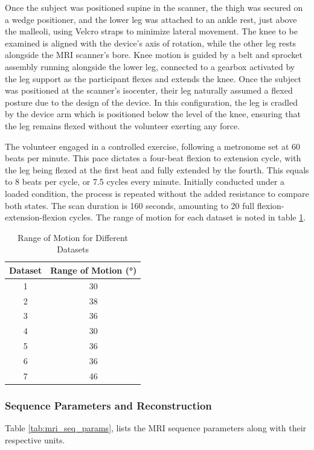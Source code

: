 \documentclass{micro-econ-thesis}
\begin{document}
Once the subject was positioned supine in the scanner, the thigh was secured on a wedge positioner, and the lower leg was attached to an ankle rest, just above the malleoli, using Velcro straps to minimize lateral movement. The knee to be examined is aligned with the device’s axis of rotation, while the other leg rests alongside the MRI scanner's bore.  Knee motion is guided by a belt and sprocket assembly running alongside the lower leg, connected to a gearbox activated by the leg support as the participant flexes and extends the knee. Once the subject was positioned at the scanner's isocenter, their leg naturally assumed a flexed posture due to the design of the device. In this configuration, the leg is cradled by the device arm which is positioned below the level of the knee, ensuring that the leg remains flexed without the volunteer exerting any force.


The volunteer engaged in a controlled exercise, following a metronome set at 60 beats per minute. This pace dictates a four-beat flexion to extension cycle, with the leg being flexed at the first beat and fully extended by the fourth. This equals to 8 beats per cycle, or 7.5 cycles every minute. Initially conducted under a loaded condition, the process is repeated without the added resistance to compare both states. The scan duration is 160 seconds, amounting to 20 full flexion-extension-flexion cycles. The range of motion for each dataset is noted in table \ref{tab:range_of_motion}. 

\begin{table}[H]
	\centering
	\label{tab:range_of_motion}
	\caption{Range of Motion for Different Datasets}
	\begin{tabular}{cc}
		\toprule
		Dataset & Range of Motion (°) \\
		\midrule
		1 & 30 \\
		2 & 38 \\
		3 & 36 \\
		4 & 30 \\
		5 & 36 \\
		6 & 36 \\
		7 & 46 \\
		\bottomrule
	\end{tabular}
	
	
\end{table}

\subsubsection{Sequence Parameters and Reconstruction}
Table \ref{tab:mri_seq_params}, lists the MRI sequence parameters along with their respective units.
\end{document}
